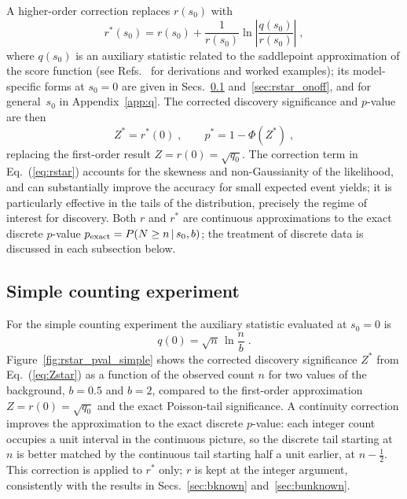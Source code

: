 \documentclass[11pt]{article}
\begin{document}
A higher-order correction \cite{BN86,LR80,Canonero23} replaces $r(s_0)$ with
%
\begin{equation}
  \label{eq:rstar}
  r^*(s_0) = r(s_0) + \frac{1}{r(s_0)}\ln\!\left|\frac{q(s_0)}{r(s_0)}\right| \;,
\end{equation}
%
\noindent where $q(s_0)$ is an auxiliary statistic related to the
saddlepoint approximation of the score function (see
Refs.~\cite{Brazzale07,Canonero23} for derivations and worked
examples); its model-specific forms at $s_0 = 0$ are given in
Secs.~\ref{sec:rstar_simple} and~\ref{sec:rstar_onoff}, and for
general~$s_0$ in Appendix~\ref{app:q}.  The corrected discovery significance and
$p$-value are then
%
\begin{equation}
  \label{eq:Zstar}
  Z^* = r^*(0) \;, \qquad p^* = 1 - \Phi(Z^*) \;,
\end{equation}
%
\noindent replacing the first-order result $Z = r(0) = \sqrt{q_0}$.
The correction term in Eq.~(\ref{eq:rstar}) accounts for the skewness
and non-Gaussianity of the likelihood, and can substantially improve
the accuracy for small expected event yields; it is particularly
effective in the tails of the distribution, precisely the regime
of interest for discovery. Both $r$ and $r^*$ are continuous approximations to the exact
discrete $p$-value $p_{\rm exact} = P(N \geq n \,|\, s_0, b)$;
the treatment of discrete data is discussed in each subsection below.

\subsection{Simple counting experiment}
\label{sec:rstar_simple}

For the simple counting experiment the auxiliary statistic evaluated
at $s_0 = 0$ is
%
\begin{equation}
  \label{eq:q_simple}
  q(0) = \sqrt{n}\,\ln\frac{n}{b} \;.
\end{equation}
%
Figure~\ref{fig:rstar_pval_simple} shows the corrected discovery
significance $Z^*$ from Eq.~(\ref{eq:Zstar}) as a function of the
observed count $n$ for two values of the background, $b = 0.5$ and
$b = 2$, compared to the first-order approximation $Z = r(0) =
\sqrt{q_0}$ and the exact Poisson-tail significance.  A continuity
correction improves the approximation to the exact discrete $p$-value: each integer count occupies
a unit interval in the continuous picture, so the discrete tail
starting at $n$ is better matched by the continuous tail starting half
a unit earlier, at $n - \tfrac{1}{2}$.  This correction is applied to
$r^*$ only; $r$ is kept at the integer argument, consistently with the
results in Secs.~\ref{sec:bknown} and~\ref{sec:bunknown}.
\end{document}
